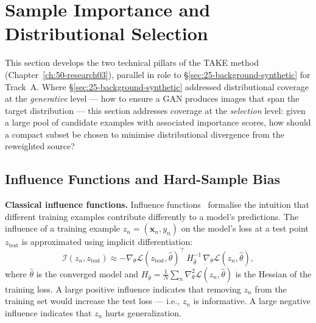 \section{Sample Importance and Distributional Selection} \label{sec:27-background-importanceselection}

\begin{foldable}
  This section develops the two technical pillars of the TAKE method (Chapter~\ref{ch:50-research03}), parallel in role to \S\ref{sec:25-background-synthetic} for Track~A.
  Where \S\ref{sec:25-background-synthetic} addressed distributional coverage at the \emph{generative} level --- how to ensure a GAN produces images that span the target distribution --- this section addresses coverage at the \emph{selection} level: given a large pool of candidate examples with associated importance scores, how should a compact subset be chosen to minimise distributional divergence from the reweighted source?
\end{foldable}

\subsection{Influence Functions and Hard-Sample Bias}
\label{sec:27-background-importanceselection-influence}

\begin{foldable}
  \textbf{Classical influence functions.}
  Influence functions~\cite{koh2017understanding} formalise the intuition that different training examples contribute differently to a model's predictions.
  The influence of a training example $z_n = (\mathbf{x}_n, y_n)$ on the model's loss at a test point $z_{\text{test}}$ is approximated using implicit differentiation:
  \begin{equation}
    \mathcal{I}(z_n, z_{\text{test}}) \approx
    -\nabla_\theta \mathcal{L}(z_{\text{test}}, \hat\theta)^\top \,
    H_{\hat\theta}^{-1} \,
    \nabla_\theta \mathcal{L}(z_n, \hat\theta),
    \label{eq:influence}
  \end{equation}
  where $\hat\theta$ is the converged model and $H_{\hat\theta} = \frac{1}{N}\sum_n \nabla^2_\theta \mathcal{L}(z_n, \hat\theta)$ is the Hessian of the training loss.
  A large positive influence indicates that removing $z_n$ from the training set would increase the test loss --- i.e., $z_n$ is informative.
  A large negative influence indicates that $z_n$ hurts generalization.
\end{foldable}

